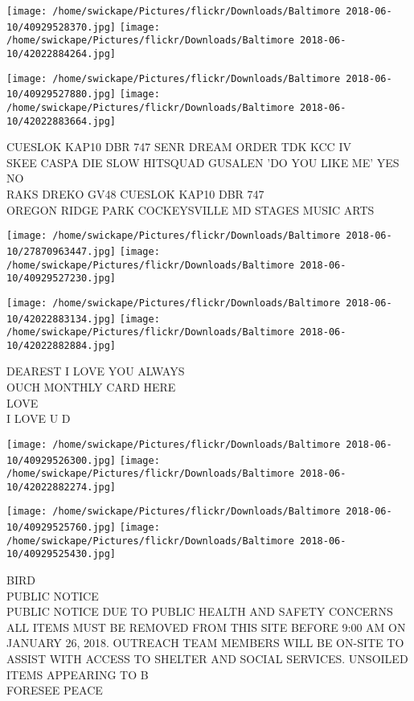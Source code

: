 \documentclass[10pt,letterpaper]{article}
\begin{document}
\texttt{[image: /home/swickape/Pictures/flickr/Downloads/Baltimore 2018-06-10/40929528370.jpg]}
\texttt{[image: /home/swickape/Pictures/flickr/Downloads/Baltimore 2018-06-10/42022884264.jpg]}

\texttt{[image: /home/swickape/Pictures/flickr/Downloads/Baltimore 2018-06-10/40929527880.jpg]}
\texttt{[image: /home/swickape/Pictures/flickr/Downloads/Baltimore 2018-06-10/42022883664.jpg]}

CUESLOK KAP10 DBR 747 SENR DREAM ORDER TDK KCC IV\\
SKEE CASPA DIE SLOW HITSQUAD GUSALEN 'DO YOU LIKE ME' YES NO\\
RAKS DREKO GV48 CUESLOK KAP10 DBR 747\\
OREGON RIDGE PARK COCKEYSVILLE MD STAGES MUSIC ARTS\\
\pagebreak

\texttt{[image: /home/swickape/Pictures/flickr/Downloads/Baltimore 2018-06-10/27870963447.jpg]}
\texttt{[image: /home/swickape/Pictures/flickr/Downloads/Baltimore 2018-06-10/40929527230.jpg]}

\texttt{[image: /home/swickape/Pictures/flickr/Downloads/Baltimore 2018-06-10/42022883134.jpg]}
\texttt{[image: /home/swickape/Pictures/flickr/Downloads/Baltimore 2018-06-10/42022882884.jpg]}

DEAREST I LOVE YOU ALWAYS\\
OUCH MONTHLY CARD HERE\\
LOVE\\
I LOVE U D\\
\pagebreak

\texttt{[image: /home/swickape/Pictures/flickr/Downloads/Baltimore 2018-06-10/40929526300.jpg]}
\texttt{[image: /home/swickape/Pictures/flickr/Downloads/Baltimore 2018-06-10/42022882274.jpg]}

\texttt{[image: /home/swickape/Pictures/flickr/Downloads/Baltimore 2018-06-10/40929525760.jpg]}
\texttt{[image: /home/swickape/Pictures/flickr/Downloads/Baltimore 2018-06-10/40929525430.jpg]}

BIRD\\
PUBLIC NOTICE\\
PUBLIC NOTICE DUE TO PUBLIC HEALTH AND SAFETY CONCERNS ALL ITEMS MUST BE REMOVED FROM THIS SITE BEFORE 9:00 AM ON JANUARY 26, 2018.  OUTREACH TEAM MEMBERS WILL BE ON{-}SITE TO ASSIST WITH ACCESS TO SHELTER AND SOCIAL SERVICES.  UNSOILED ITEMS APPEARING TO B\\
FORESEE PEACE\\
\pagebreak
\end{document}
